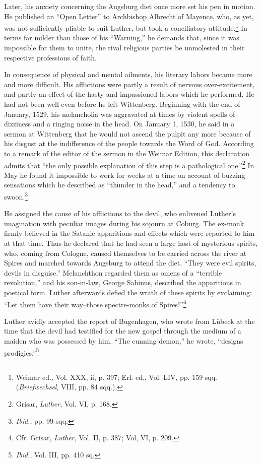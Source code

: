 Later, his anxiety concerning the Augsburg diet once more set his
pen in motion. He published an “Open Letter” to Archbishop Albrecht of
Mayence, who, as yet, was not sufficiently pliable to suit
Luther, but took a conciliatory attitude.\footnote
{Weimar ed., Vol. XXX, ii, p. 397; Erl. ed., Vol. LIV, pp. 159 sqq. (\textit{Briefwechsel},
VIII, pp. 84 sqq.).}
In terms far milder than
those of his “Warning,” he demands that, since it was impossible for
them to unite, the rival religious parties be unmolested in their respective
professions of faith.

In consequence of physical and mental ailments, his literary labors
became more and more difficult. His afflictions were partly a result of
nervous over-excitement, and partly an effect of the hasty and impassioned
labors which he performed. He had not been well even
before he left Wittenberg. Beginning with the end of January, 1529,
his melancholia was aggravated at times by violent spells of dizziness
and a ringing noise in the head. On January 1, 1530, he said in a sermon
at Wittenberg that he would not ascend the pulpit any more
because of his disgust at the indifference of the people towards the
Word of God. According to a remark of the editor of the sermon in
the Weimar Edition, this declaration admits that “the only possible
explanation of this step is a pathological one.”\footnote
{Grisar, \textit{Luther}, Vol. VI, p. 168.}
In May he found it
impossible to work for weeks at a time on account of buzzing sensations
which he described as “thunder in the head,” and a tendency to
swoon.\footnote{\textit{Ibid.}, pp. 99 sqq.}

He assigned the cause of his afflictions to the devil, who enlivened
Luther’s imagination with peculiar images during his sojourn at Coburg.
The ex-monk firmly believed in the Satanic apparitions and
effects which were reported to him at that time. Thus he declared
that he had seen a large host of mysterious spirits, who, coming from
Cologne, caused themselves to be carried across the river at Spires and
marched towards Augsburg to attend the diet. “They were evil spirits,
devils in disguise.” Melanchthon regarded them as omens of a “terrible
revolution,” and his son-in-law, George Sabinus, described the
apparitions in poetical form. Luther afterwards defied the wrath of
these spirits by exclaiming: “Let them have their way--those spectre-monks
of Spires!”\footnote{Cfr. Grisar, \textit{Luther}, Vol. II, p. 387; Vol, VI, p. 209.}

Luther avidly accepted the report of Bugenhagen, who wrote from Lübeck
at the time that the devil had testified for the new gospel through the medium of a maiden who was
possessed by him. “The cunning demon,” he wrote, “designs prodigies.”\footnote
{\textit{Ibid.}, Vol. III, pp. 410 sq.}

